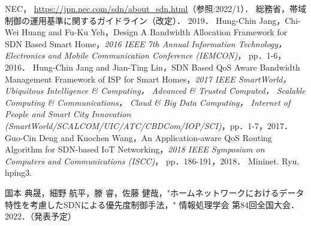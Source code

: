 \documentclass[a4paper,11pt,uplatex]{ujreport}
\begin{document}
\renewcommand{\bibname}{参考文献}

\begin{thebibliography}{99}
   NEC， \url{https://jpn.nec.com/sdn/about_sdn.html}（参照:2022/1）．
   総務省，帯域制御の運用基準に関するガイドライン（改定）． 2019．
   Hung-Chin Jang，Chi-Wei Huang and Fu-Ku Yeh，Design
  A Bandwidth Allocation Framework for SDN Based Smart
  Home，\textit{2016 IEEE 7th Annual Information Technology，
  Electronics and Mobile Communication Conference (IEMCON)}，
  pp．1-6，2016．
   Hung-Chin Jang and Jian-Ting Lin，SDN Based QoS Aware Bandwidth Management Framework of ISP for Smart Homes，\textit{2017 IEEE SmartWorld， Ubiquitous Intelligence \& Computing， Advanced \& Trusted Computed， Scalable Computing \& Communications， Cloud \& Big Data Computing， Internet of People and Smart City Innovation (SmartWorld/SCALCOM/UIC/ATC/CBDCom/IOP/SCI)}，pp．1-7，2017．
   Guo-Cin Deng and Kuochen Wang，An Application-aware QoS Routing Algorithm for SDN-based IoT Networking，\textit{2018 IEEE Symposium on Computers and Communications (ISCC)}， pp．186-191，2018．
   Mininet.
   Ryu.
   hping3.
\end{thebibliography}

% 
% 

\label{chap:Bibiliography}

\renewcommand{\bibname}{研究業績}

\begin{thebibliography}{99}
  \bibitem{} 国本 典晟，細野 航平，滕 睿，佐藤 健哉，"ホームネットワークにおけるデータ特性を考慮したSDNによる優先度制御手法，" 情報処理学会 第84回全国大会．2022．（発表予定）
\end{thebibliography}

\label{chap:Publications}

\end{document}
